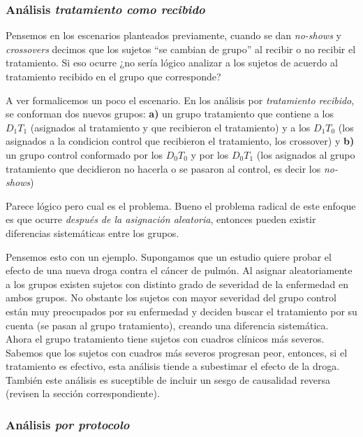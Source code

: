 \documentclass[
  letterpaper,
  DIV=11,
  numbers=noendperiod,
  oneside]{scrreprt}
\begin{document}
\hypertarget{anuxe1lisis-tratamiento-como-recibido}{%
\subsubsection{\texorpdfstring{Análisis \emph{tratamiento como
recibido}}{Análisis tratamiento como recibido}}\label{anuxe1lisis-tratamiento-como-recibido}}

Pensemos en los escenarios planteados previamente, cuando se dan
\emph{no-shows} y \emph{crossovers} decimos que los sujetos ``se cambian
de grupo'' al recibir o no recibir el tratamiento. Si eso ocurre ¿no
sería lógico analizar a los sujetos de acuerdo al tratamiento recibido
en el grupo que corresponde?

A ver formalicemos un poco el escenario. En los análisis por
\emph{tratamiento recibido}, se conforman dos nuevos grupos: \textbf{a)}
un grupo tratamiento que contiene a los \(D_1 T_1\) (asignados al
tratamiento y que recibieron el tratamiento) y a los \(D_1 T_0\) (los
asignados a la condicion control que recibieron el tratamiento, los
crossover) y \textbf{b)} un grupo control conformado por los \(D_0 T_0\)
y por los \(D_0 T_1\) (los asignados al grupo tratamiento que decidieron
no hacerla o se pasaron al control, es decir los \emph{no-shows})

Parece lógico pero cual es el problema. Bueno el problema radical de
este enfoque es que ocurre \emph{después de la asignación aleatoria},
entonces pueden existir diferencias sistemáticas entre los grupos.

Pensemos esto con un ejemplo. Supongamos que un estudio quiere probar el
efecto de una nueva droga contra el cáncer de pulmón. Al asignar
aleatoriamente a los grupos existen sujetos con distinto grado de
severidad de la enfermedad en ambos grupos. No obstante los sujetos con
mayor severidad del grupo control están muy preocupados por su
enfermedad y deciden buscar el tratamiento por su cuenta (se pasan al
grupo tratamiento), creando una diferencia sistemática. Ahora el grupo
tratamiento tiene sujetos con cuadros clínicos más severos. Sabemos que
los sujetos con cuadros más severos progresan peor, entonces, si el
tratamiento es efectivo, esta análisis tiende a subestimar el efecto de
la droga. También este análisis es suceptible de incluir un sesgo de
causalidad reversa (revisen la sección correspondiente).

\hypertarget{anuxe1lisis-por-protocolo}{%
\subsubsection{\texorpdfstring{Análisis \emph{por
protocolo}}{Análisis por protocolo}}\label{anuxe1lisis-por-protocolo}}
\end{document}
